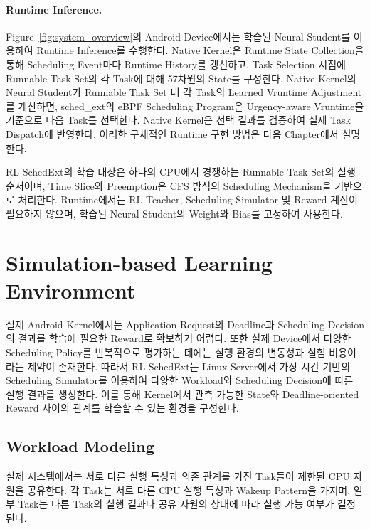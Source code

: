 \paragraph{Runtime Inference.}
Figure~\ref{fig:system_overview}의 Android Device에서는 학습된 Neural Student를 이용하여 Runtime Inference를 수행한다.
Native Kernel은 Runtime State Collection을 통해 Scheduling Event마다 Runtime History를 갱신하고, Task Selection 시점에 Runnable Task Set의 각 Task에 대해 57차원의 State를 구성한다.
Native Kernel의 Neural Student가 Runnable Task Set 내 각 Task의 Learned Vruntime Adjustment를 계산하면, sched\_ext의 eBPF Scheduling Program은 Urgency-aware Vruntime을 기준으로 다음 Task를 선택한다.
Native Kernel은 선택 결과를 검증하여 실제 Task Dispatch에 반영한다. 이러한 구체적인 Runtime 구현 방법은 다음 Chapter에서 설명한다.

RL-SchedExt의 학습 대상은 하나의 CPU에서 경쟁하는 Runnable Task Set의 실행 순서이며, Time Slice와 Preemption은 CFS 방식의 Scheduling Mechanism을 기반으로 처리한다.
Runtime에서는 RL Teacher, Scheduling Simulator 및 Reward 계산이 필요하지 않으며, 학습된 Neural Student의 Weight와 Bias를 고정하여 사용한다.

\section{Simulation-based Learning Environment}
\label{sec:design-simulation-based-learning-environment}

실제 Android Kernel에서는 Application Request의 Deadline과 Scheduling Decision의 결과를 학습에 필요한 Reward로 확보하기 어렵다.
또한 실제 Device에서 다양한 Scheduling Policy를 반복적으로 평가하는 데에는 실행 환경의 변동성과 실험 비용이라는 제약이 존재한다.
따라서 RL-SchedExt는 Linux Server에서 가상 시간 기반의 Scheduling Simulator를 이용하여 다양한 Workload와 Scheduling Decision에 따른 실행 결과를 생성한다.
이를 통해 Kernel에서 관측 가능한 State와 Deadline-oriented Reward 사이의 관계를 학습할 수 있는 환경을 구성한다.

\subsection{Workload Modeling}
\label{sec:design-workload-modeling}
실제 시스템에서는 서로 다른 실행 특성과 의존 관계를 가진
Task들이 제한된 CPU 자원을 공유한다.
각 Task는 서로 다른 CPU 실행 특성과 Wakeup Pattern을 가지며,
일부 Task는 다른 Task의 실행 결과나 공유 자원의 상태에 따라
실행 가능 여부가 결정된다.

